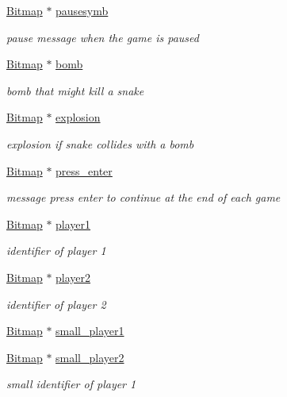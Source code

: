 \begin{DoxyCompactItemize}
\hyperlink{structBitmap}{Bitmap} $\ast$ \hyperlink{group__graphics_ga3b47ad4f61b00c3e5527f2bec90890b5}{pausesymb}
\begin{DoxyCompactList}\small\item\em pause message when the game is paused \end{DoxyCompactList}\item 
\hyperlink{structBitmap}{Bitmap} $\ast$ \hyperlink{group__graphics_ga86313247313ec7e1e264d13835d7d012}{bomb}
\begin{DoxyCompactList}\small\item\em bomb that might kill a snake \end{DoxyCompactList}\item 
\hyperlink{structBitmap}{Bitmap} $\ast$ \hyperlink{group__graphics_gac0df1ce2b02d6d52203766b8cb13c9bf}{explosion}
\begin{DoxyCompactList}\small\item\em explosion if snake collides with a bomb \end{DoxyCompactList}\item 
\hyperlink{structBitmap}{Bitmap} $\ast$ \hyperlink{group__graphics_gaf891e78c1cd9b89f53a3cf6032f88e71}{press\+\_\+enter}
\begin{DoxyCompactList}\small\item\em message press enter to continue at the end of each game \end{DoxyCompactList}\item 
\hyperlink{structBitmap}{Bitmap} $\ast$ \hyperlink{group__graphics_ga279ac50f42320cb39cbc02270e40597a}{player1}
\begin{DoxyCompactList}\small\item\em identifier of player 1 \end{DoxyCompactList}\item 
\hyperlink{structBitmap}{Bitmap} $\ast$ \hyperlink{group__graphics_gaaee24419ba914b7d473d1f5e06d84272}{player2}
\begin{DoxyCompactList}\small\item\em identifier of player 2 \end{DoxyCompactList}\item 
\hyperlink{structBitmap}{Bitmap} $\ast$ \hyperlink{group__graphics_ga500b120fd59215d5436fe2121557d34a}{small\+\_\+player1}
\item 
\hyperlink{structBitmap}{Bitmap} $\ast$ \hyperlink{group__graphics_ga6d0717c0730d1f4bf907299c4cb3fb97}{small\+\_\+player2}
\begin{DoxyCompactList}\small\item\em small identifier of player 1 \end{DoxyCompactList}\item 

\end{DoxyCompactItemize}
